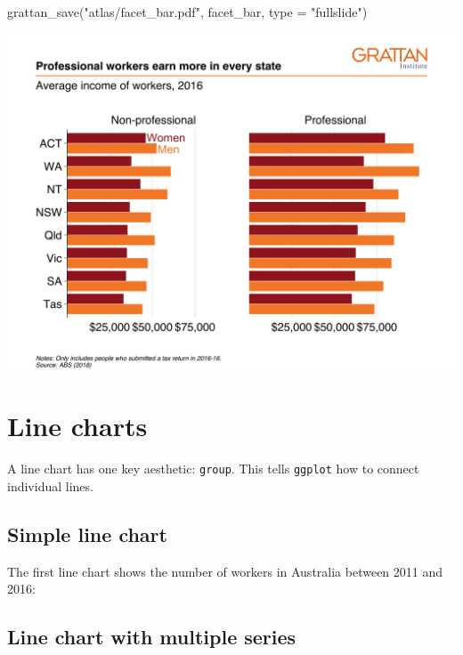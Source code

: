 \documentclass[
]{book}
\newenvironment{Shaded}{\begin{snugshade}}{\end{snugshade}}
\newcommand{\AttributeTok}[1]{\textcolor[rgb]{0.77,0.63,0.00}{#1}}
\newcommand{\FunctionTok}[1]{\textcolor[rgb]{0.00,0.00,0.00}{#1}}
\newcommand{\NormalTok}[1]{#1}
\newcommand{\StringTok}[1]{\textcolor[rgb]{0.31,0.60,0.02}{#1}}
\begin{document}
\begin{Shaded}
\begin{Highlighting}[]
\FunctionTok{grattan\_save}\NormalTok{(}\StringTok{"atlas/facet\_bar.pdf"}\NormalTok{, facet\_bar, }\AttributeTok{type =} \StringTok{"fullslide"}\NormalTok{)}
\end{Highlighting}
\end{Shaded}

\includegraphics{atlas/facet_bar.png}

\hypertarget{line-charts}{%
\section{Line charts}\label{line-charts}}

A line chart has one key aesthetic: \texttt{group}. This tells \texttt{ggplot} how to connect individual lines.

\hypertarget{simple-line-chart}{%
\subsection{Simple line chart}\label{simple-line-chart}}

The first line chart shows the number of workers in Australia between 2011 and 2016:

\hypertarget{line-chart-with-multiple-series}{%
\subsection{Line chart with multiple series}\label{line-chart-with-multiple-series}}
\end{document}
